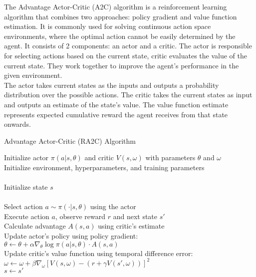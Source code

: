 \documentclass[preprint,12pt]{elsarticle}
\begin{document}
The Advantage Actor-Critic (A2C) algorithm is a reinforcement learning algorithm that combines two approaches: policy gradient and value function estimation. It is commonly used for solving continuous action space environments, where the optimal action cannot be easily determined by the agent. It consists of 2 components: an actor and a critic. The actor is responsible for selecting actions based on the current state, critic evaluates the value of the current state. They work together to improve the agent's performance in the given environment.\\
The actor takes current states as the inputs and outputs a probability distribution over the possible actions. The critic takes the current states as input and outputs an estimate of the state's value. The value function estimate represents expected cumulative reward the agent receives from that state onwards.\\
\begin{algorithm}[!htbp]
\caption{Advantage Actor-Critic (RA2C) Algorithm}
\begin{algorithmic}
    \STATE Initialize actor $\pi(a|s,\theta)$ and critic $V(s,\omega)$ with parameters $\theta$ and $\omega$\\
    \STATE Initialize environment, hyperparameters, and training parameters\\
    \\
        \STATE Initialize state $s$\\
        \\
            \STATE Select action $a \sim \pi(\cdot|s,\theta)$ using the actor\\
            \STATE Execute action $a$, observe reward $r$ and next state $s'$\\
            \STATE Calculate advantage $A(s,a)$ using critic's estimate\\
            \STATE Update actor's policy using policy gradient:\\
            \STATE \quad $\theta \leftarrow \theta + \alpha \nabla_\theta \log \pi(a|s,\theta) \cdot A(s,a)$\\
            \STATE Update critic's value function using temporal difference error:\\
            \STATE \quad $\omega \leftarrow \omega + \beta \nabla_\omega [V(s,\omega) - (r + \gamma V(s',\omega))]^2$\\
            \STATE $s \leftarrow s'$\\
        \ENDFOR\\
    \ENDFOR\\
\end{algorithmic}
\end{algorithm}
\end{document}
